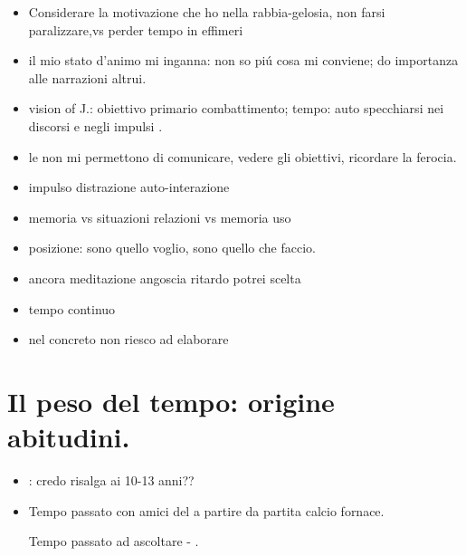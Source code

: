 \begin{itemize}

\item Considerare la motivazione che ho nella rabbia-gelosia, non farsi paralizzare,vs perder tempo in effimeri

\item il mio stato d'animo mi inganna: non so pi\'u cosa mi conviene; do importanza alle narrazioni altrui.

\item vision of J.: obiettivo primario combattimento; tempo: auto specchiarsi nei discorsi e negli impulsi .

\item le  non mi permettono di comunicare, vedere gli obiettivi, ricordare la ferocia.

\item impulso  distrazione auto-interazione 

\item memoria  vs  situazioni relazioni vs memoria uso

\item posizione: sono quello voglio, sono quello che faccio.

\item ancora meditazione angoscia ritardo potrei scelta

\item tempo continuo

\item nel concreto non riesco ad elaborare

\end{itemize}

\section{Il peso del tempo: origine abitudini.}

\begin{itemize}

\item {}: credo risalga ai 10-13 anni??

\item Tempo passato con amici del  a partire da partita calcio fornace.

Tempo passato ad ascoltare - .

\end{itemize}

